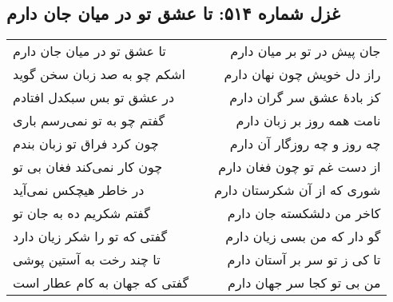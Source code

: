 \begin{center}
\section*{غزل شماره ۵۱۴: تا عشق تو در میان جان دارم}
\label{sec:514}
\begin{longtable}{l p{0.5cm} r}
تا عشق تو در میان جان دارم
&&
جان پیش در تو بر میان دارم
\\
اشکم چو به صد زبان سخن گوید
&&
راز دل خویش چون نهان دارم
\\
در عشق تو بس سبکدل افتادم
&&
کز بادهٔ عشق سر گران دارم
\\
گفتم چو به تو نمی‌رسم باری
&&
نامت همه روز بر زبان دارم
\\
چون کرد فراق تو زبان بندم
&&
چه روز و چه روزگار آن دارم
\\
چون کار نمی‌کند فغان بی تو
&&
از دست غم تو چون فغان دارم
\\
در خاطر هیچکس نمی‌آید
&&
شوری که از آن شکرستان دارم
\\
گفتم شکریم ده به جان تو
&&
کاخر من دلشکسته جان دارم
\\
گفتی که تو را شکر زیان دارد
&&
گو دار که من بسی زیان دارم
\\
تا چند رخت به آستین پوشی
&&
تا کی ز تو سر بر آستان دارم
\\
گفتی که جهان به کام عطار است
&&
من بی تو کجا سر جهان دارم
\\
\end{longtable}
\end{center}
